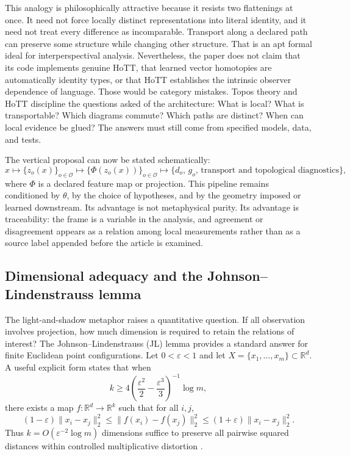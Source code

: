 This analogy is philosophically attractive because it resists two flattenings at once. It need not force locally distinct representations into literal identity, and it need not treat every difference as incomparable. Transport along a declared path can preserve some structure while changing other structure. That is an apt formal ideal for interperspectival analysis. Nevertheless, the paper does not claim that its code implements genuine HoTT, that learned vector homotopies are automatically identity types, or that HoTT establishes the intrinsic observer dependence of language. Those would be category mistakes. Topos theory and HoTT discipline the questions asked of the architecture: What is local? What is transportable? Which diagrams commute? Which paths are distinct? When can local evidence be glued? The answers must still come from specified models, data, and tests.

The vertical proposal can now be stated schematically:
\begin{equation}
    x
    \longmapsto \{z_o(x)\}_{o\in\mathcal{O}}
    \longmapsto \{\Phi(z_o(x))\}_{o\in\mathcal{O}}
    \longmapsto
    \bigl\{d_o,\,g_o,\,\text{transport and topological diagnostics}\bigr\},
    \label{eq:vertical-pipeline}
\end{equation}
where \(\Phi\) is a declared feature map or projection. This pipeline remains conditioned by \(\theta\), by the choice of hypotheses, and by the geometry imposed or learned downstream. Its advantage is not metaphysical purity. Its advantage is traceability: the frame is a variable in the analysis, and agreement or disagreement appears as a relation among local measurements rather than as a source label appended before the article is examined.

\subsection{Dimensional adequacy and the Johnson--Lindenstrauss lemma}

The light-and-shadow metaphor raises a quantitative question. If all observation involves projection, how much dimension is required to retain the relations of interest? The Johnson--Lindenstrauss (JL) lemma provides a standard answer for finite Euclidean point configurations. Let \(0<\varepsilon<1\) and let \(X=\{x_1,\ldots,x_m\}\subset\mathbb{R}^{d}\). A useful explicit form states that when
\begin{equation}
    k\geq
    4\left(\frac{\varepsilon^2}{2}-
             \frac{\varepsilon^3}{3}\right)^{-1}\log m,
    \label{eq:jl-dimension}
\end{equation}
there exists a map \(f\colon\mathbb{R}^{d}\to\mathbb{R}^{k}\) such that for all \(i,j\),
\begin{equation}
    (1-\varepsilon)\lVert x_i-x_j\rVert_2^2
    \leq \lVert f(x_i)-f(x_j)\rVert_2^2
    \leq (1+\varepsilon)\lVert x_i-x_j\rVert_2^2.
    \label{eq:jl-guarantee}
\end{equation}
Thus \(k=O(\varepsilon^{-2}\log m)\) dimensions suffice to preserve all pairwise squared distances within controlled multiplicative distortion \citep{johnsonlindenstrauss1984,dasguptagupta2003}.

